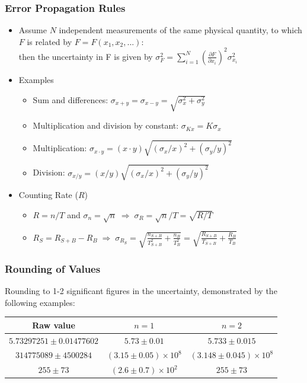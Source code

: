 \subsubsection{Error Propagation Rules}
\begin{itemize}
    \item Assume $N$ independent measurements of the same physical quantity, to which $F$ is related by $F=F(x_1,x_2,...)$:\\
    then the uncertainty in F is given by $\sigma_F^2=\sum_{i=1}^N\left(\frac{\partial F}{\partial x_i}\right)^2\sigma^2_{x_i}$
    \item Examples
    \begin{itemize}
        \item Sum and differences: $\sigma_{x+y}=\sigma_{x-y}=\sqrt{\sigma_x^2+\sigma_y^2}$
        \item Multiplication and division by constant: $\sigma_{Kx}=K\sigma_x$
        \item Multiplication: $\sigma_{x\cdot y}=(x\cdot y)\sqrt{\left(\sigma_x/x\right)^2+\left(\sigma_y/y\right)^2}$
        \item Division: $\sigma_{x/y}=({x}/{y})\sqrt{\left(\sigma_x/x\right)^2+\left(\sigma_y/y\right)^2}$
    \end{itemize}
    \item Counting Rate ($R$)
    \begin{itemize}
        \item[] $R=n/T$ and $\sigma_n=\sqrt{n}\;\Rightarrow\;\sigma_R=\sqrt{n}/{T}=\sqrt{R/T}$
        \item[] $R_S=R_{S+B}-R_B\;\Rightarrow\;\sigma_{R_S}=\sqrt{\frac{n_{S+B}}{T_{S+B}^2}+\frac{n_{B}}{T_{B}^2}}=\sqrt{\frac{R_{S+B}}{T_{S+B}}+\frac{R_B}{T_B}}$
    \end{itemize}
\end{itemize}
\subsubsection{Rounding of Values}
Rounding to 1-2 significant figures in the uncertainty, demonstrated by the following examples:
\begin{center}
\begin{tabular}{c c c}
    Raw value & $n=1$ & $n=2$\\
    \hline
    $5.73297251\pm0.01477602$ &  $5.73\pm0.01$ & $5.733\pm0.015$ \\
    $314775089\pm4500284$ & $(3.15\pm0.05)\times10^8$ & $(3.148\pm0.045)\times10^8$ \\
    $255\pm73$ & $(2.6\pm0.7)\times10^2$ & $255\pm73$
\end{tabular}  
\end{center}
